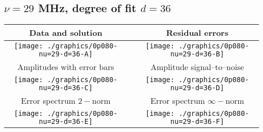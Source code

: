 

% 

\clearpage{}
\break{}

\subsection{$\nu = 29$ MHz, degree of fit $d = 36$}

\begin{table}[h]
    \begin{center}
        \begin{tabular}{ccc}
            Data and solution & \quad & Residual errors \\\hline
            \texttt{[image: ./graphics/0p080-nu=29-d=36-A]} &&
            \texttt{[image: ./graphics/0p080-nu=29-d=36-B]} \\[15pt]
            Amplitudes with error bars && Amplitude signal--to--noise \\\hline
            \texttt{[image: ./graphics/0p080-nu=29-d=36-C]} &&
            \texttt{[image: ./graphics/0p080-nu=29-d=36-D]} \\[15pt]
            Error spectrum $2-$norm && Error spectrum $\infty-$norm \\\hline
            \texttt{[image: ./graphics/0p080-nu=29-d=36-E]} &&
            \texttt{[image: ./graphics/0p080-nu=29-d=36-F]} \\[15pt]
        \end{tabular}
    \end{center}
\label{fig:elev=80, nu=29}
\end{table}



\endinput
